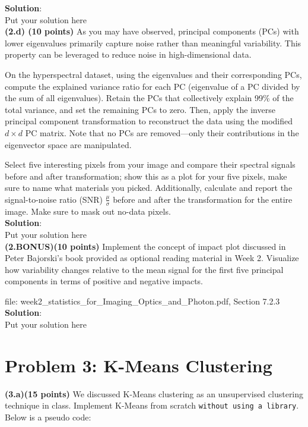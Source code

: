 \documentclass[12pt]{article}
\begin{document}
\noindent\textbf{Solution}:\\
Put your solution here\\

\noindent\textbf{(2.d) (10 points)} As you may have observed, principal components (PCs) with lower eigenvalues primarily capture noise rather than meaningful variability. This property can be leveraged to reduce noise in high-dimensional data. 

On the hyperspectral dataset, using the eigenvalues and their corresponding PCs, compute the explained variance ratio for each PC (eigenvalue of a PC divided by the sum of all eigenvalues). Retain the PCs that collectively explain 99\% of the total variance, and set the remaining PCs to zero. Then, apply the inverse principal component transformation to reconstruct the data using the modified \( d \times d \) PC matrix. Note that no PCs are removed—only their contributions in the eigenvector space are manipulated. 

Select five interesting pixels from your image and compare their spectral signals before and after transformation; show this as a plot for your five pixels, make sure to name what materials you picked. Additionally, calculate and report the signal-to-noise ratio (SNR) \(\frac{\mu}{\sigma}\) before and after the transformation for the entire image. Make sure to mask out no-data pixels.\\


\noindent\textbf{Solution}:\\
Put your solution here\\

\noindent\textbf{(2.BONUS)(10 points)} Implement the concept of impact plot discussed in Peter Bajorski's book provided as optional reading material in Week 2. Visualize how variability changes relative to the mean signal for the first five principal components in terms of positive and negative impacts. 

file: week2\_statistics\_for\_Imaging\_Optics\_and\_Photon.pdf, Section 7.2.3\\

\noindent\textbf{Solution}:\\
Put your solution here\\

\section*{Problem 3: K-Means Clustering}

\noindent\textbf{(3.a)(15 points)} We discussed K-Means clustering as an unsupervised clustering technique in class. Implement K-Means from scratch \texttt{without using a library}. Below is a pseudo code:
\end{document}

